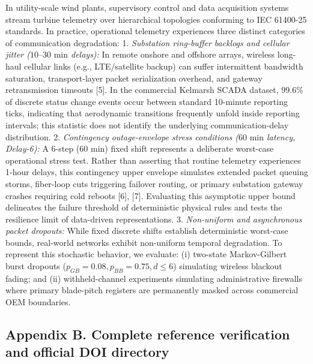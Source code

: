 \documentclass[
  journal]{IEEEtran}
\begin{document}
In utility-scale wind plants, supervisory control and data acquisition
systems stream turbine telemetry over hierarchical topologies conforming
to IEC 61400-25 standards. In practice, operational telemetry
experiences three distinct categories of communication degradation: 1.
\emph{Substation ring-buffer backlogs and cellular jitter
(\(10\text{--}30\text{ min}\) delays):} In remote onshore and offshore
arrays, wireless long-haul cellular links (e.g., LTE/satellite backup)
can suffer intermittent bandwidth saturation, transport-layer packet
serialization overhead, and gateway retransmission timeouts {[}5{]}. In
the commercial Kelmarsh SCADA dataset, \(99.6\%\) of discrete status
change events occur between standard 10-minute reporting ticks,
indicating that aerodynamic transitions frequently unfold inside
reporting intervals; this statistic does not identify the underlying
communication-delay distribution. 2. \emph{Contingency outage-envelope
stress conditions (\(60\text{ min}\) latency, Delay-6):} A 6-step
(\(60\text{ min}\)) fixed shift represents a deliberate worst-case
operational stress test. Rather than asserting that routine telemetry
experiences 1-hour delays, this contingency upper envelope simulates
extended packet queuing storms, fiber-loop cuts triggering failover
routing, or primary substation gateway crashes requiring cold reboots
{[}6{]}, {[}7{]}. Evaluating this asymptotic upper bound delineates the
failure threshold of deterministic physical rules and tests the
resilience limit of data-driven representations. 3. \emph{Non-uniform
and asynchronous packet dropouts:} While fixed discrete shifts establish
deterministic worst-case bounds, real-world networks exhibit non-uniform
temporal degradation. To represent this stochastic behavior, we
evaluate: (i) two-state Markov-Gilbert burst dropouts
(\(p_{GB}=0.08, p_{BB}=0.75, d \le 6\)) simulating wireless blackout
fading; and (ii) withheld-channel experiments simulating administrative
firewalls where primary blade-pitch registers are permanently masked
across commercial OEM boundaries.

\FloatBarrier

\subsection*{Appendix B. Complete reference verification and official
DOI
directory}\label{appendix-b.-complete-reference-verification-and-official-doi-directory}
\end{document}
